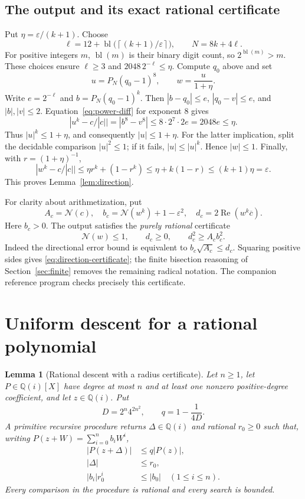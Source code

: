 \documentclass[11pt,letterpaper]{article}
\newtheorem{lemma}[theorem]{Lemma}
\theoremstyle{definition}\newtheorem{definition}[theorem]{Definition}
\theoremstyle{remark}\newtheorem{remark}[theorem]{Remark}
\newcommand{\GQ}{\mathbb Q(i)}\newcommand{\C}{\mathbb C}
\newcommand{\nn}[1]{\mathcal N(#1)}
\newcommand{\ceil}[1]{\left\lceil#1\right\rceil}
\newcommand{\bl}{\operatorname{bl}}
\newcommand{\re}{\operatorname{Re}}\newcommand{\im}{\operatorname{Im}}
\begin{document}
\subsection{The output and its exact rational certificate}

Put $\eta=\varepsilon/(k+1)$. Choose
\[
 \ell=12+\bl\bigl(\ceil{(k+1)/\varepsilon}\bigr),
 \qquad N=8k+4\ell.
\]
For positive integers $m$, $\bl(m)$ is their binary digit count, so
$2^{\bl(m)}>m$. These choices ensure $\ell\ge3$ and
$2048\,2^{-\ell}\le\eta$.
Compute $q_0$ above and set
\begin{equation}
 u=P_N(q_0-1)^8,\qquad w=\frac{u}{1+\eta}.
 \label{eq:direction-output}
\end{equation}
Write $e=2^{-\ell}$ and $b=P_N(q_0-1)^k$.
Then $|b-q_0|\le e$, $|q_0-v|\le e$, and $|b|,|v|\le2$.
Equation~\eqref{eq:power-diff} for exponent $8$ gives
\[
 |u^k-c/|c||=|b^8-v^8|\le8\cdot2^7\cdot2e
                  =2048e\le\eta.
\]
Thus $|u|^k\le1+\eta$, and consequently $|u|\le1+\eta$.
For the latter implication, split the decidable comparison $|u|^2\le1$;
if it fails, $|u|\le|u|^k$. Hence $|w|\le1$.
Finally, with $r=(1+\eta)^{-1}$,
\[
 |w^k-c/|c||\le\eta r^k+(1-r^k)
       \le\eta+k(1-r)\le(k+1)\eta=\varepsilon.
\]
This proves Lemma~\ref{lem:direction}.

For clarity about arithmetization, put
\[
 A_c=\nn c,\quad b_c=\nn{w^k}+1-\varepsilon^2,
 \quad d_c=2\re(w^k\overline c).
\]
Here $b_c>0$. The output satisfies the \emph{purely rational} certificate
\begin{equation}
 \nn w\le1,\qquad d_c\ge0,\qquad d_c^2\ge A_cb_c^2.
 \label{eq:direction-certificate}
\end{equation}
Indeed the directional error bound is equivalent to
$b_c\sqrt{A_c}\le d_c$. Squaring positive sides gives
\eqref{eq:direction-certificate}; the finite bisection reasoning of
Section~\ref{sec:finite} removes the remaining radical notation.
The companion reference program checks precisely this certificate.

\section{Uniform descent for a rational polynomial}
\label{sec:descent}

\begin{lemma}[Rational descent with a radius certificate]
\label{lem:descent}
Let $n\ge1$, let $P\in\GQ[X]$ have degree at most $n$ and at least one
nonzero positive-degree coefficient, and let $z\in\GQ$. Put
\[
 D=2^n4^{2n^2},\qquad q=1-\frac1{4D}.
\]
A primitive recursive procedure returns $\Delta\in\GQ$ and rational
$r_0\ge0$ such that, writing $P(z+W)=\sum_{i=0}^n b_iW^i$,
\begin{align}
 |P(z+\Delta)|&\le q|P(z)|,\label{eq:descent-contraction}\\
 |\Delta|&\le r_0,\label{eq:descent-radius}\\
 |b_i|r_0^i&\le|b_0| \quad(1\le i\le n).
 \label{eq:radius-cert}
\end{align}
Every comparison in the procedure is rational and every search is bounded.
\end{lemma}
\end{document}
